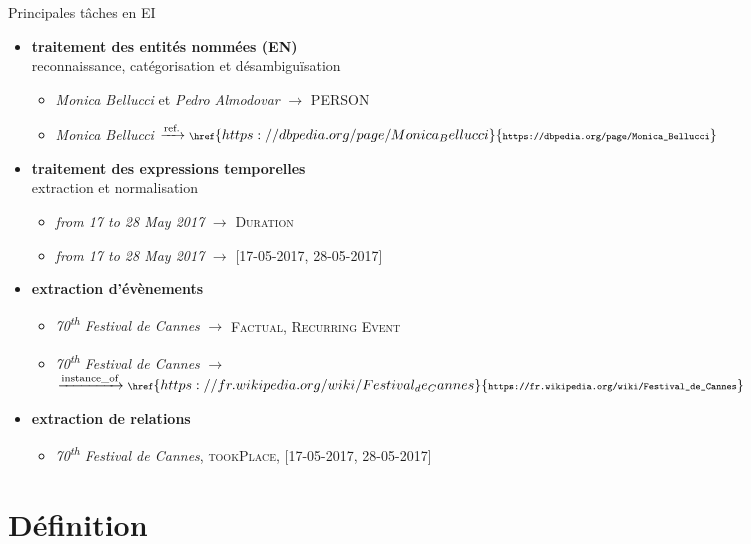 \documentclass[xetex,xcolor={table,usenames,dvipsnames}]{beamer}
\newcommand{\bolder}[1]{{\color{purple}\bfseries#1}}
\begin{document}
\begin{frame}{Principales tâches en \textsc{EI}}
	\begin{itemize}
		\item \bolder{traitement des entités nommées (\textsc{EN})}\\
		reconnaissance, catégorisation et désambiguïsation
		\begin{itemize}
			\item \textit{Monica Bellucci} et \textit{Pedro Almodovar} $\rightarrow$ \textsc{PERSON}
			\item \textit{Monica Bellucci} $\xrightarrow{\text{ref.}} {\scriptsize \href{https://dbpedia.org/page/Monica_Bellucci}{\texttt{https://dbpedia.org/page/Monica\_Bellucci}}}$
		\end{itemize}
		\item \bolder{traitement des expressions temporelles}\\
		extraction et normalisation
		\begin{itemize}
			\item \textit{from 17 to 28 May 2017} $\rightarrow$ \textsc{Duration}
			\item \textit{from 17 to 28 May 2017} $\rightarrow$ [\textsc{17-05-2017}, \textsc{28-05-2017}]
		\end{itemize}
		\item \bolder{extraction d'évènements}
		\begin{itemize}
			\item \textit{70\textsuperscript{th} Festival de Cannes} $\rightarrow$ \textsc{Factual, Recurring Event}
			\item \textit{70\textsuperscript{th} Festival de Cannes} $\rightarrow$ $\xrightarrow{\text{instance\_of}} {\scriptsize \href{https://fr.wikipedia.org/wiki/Festival_de_Cannes}{\texttt{https://fr.wikipedia.org/wiki/Festival\_de\_Cannes}}}$
		\end{itemize}
		\item \bolder{extraction de relations}
		\begin{itemize}
			\item \textit{70\textsuperscript{th} Festival de Cannes}, \textsc{tookPlace}, [\textsc{17-05-2017, 28-05-2017}]
		\end{itemize}
	\end{itemize}
\end{frame}

\section{Définition}
\end{document}
